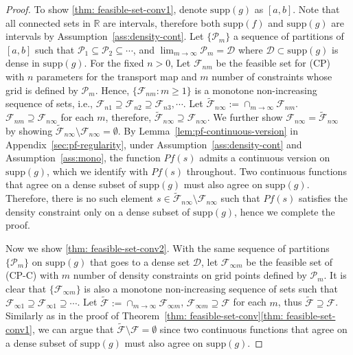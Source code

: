 \documentclass[12pt,leqno]{amsart}
\begin{document}
\begin{proof}
To show \ref{thm: feasible-set-conv1}, denote $\mathrm{supp}(g)$ as $[a, b]$. Note that all connected sets in $\mathbb R$ are intervals, therefore both $\mathrm{supp}(f)$ and $\mathrm{supp}(g)$ are intervals by Assumption~\ref{ass:density-cont}. Let $\{\mathcal{P}_m\}$ a sequence of partitions of $[a, b]$ such that $\mathcal{P}_1\subseteq\mathcal{P}_2\subseteq\cdots$, and $\lim_{m\rightarrow\infty}\mathcal{P}_m=\mathcal{D}$ where $\mathcal{D}\subset \mathrm{supp}(g)$ is dense in $\mathrm{supp}(g)$. For the fixed $n>0$, Let $\mathcal{F}_{nm}$ be the feasible set for (CP) with $n$ parameters for the transport map and $m$ number of constraints whose grid is defined by $\mathcal{P}_m$. Hence, $\{\mathcal{F}_{nm}: m \geq 1\}$ is a monotone non-increasing sequence of sets, i.e., $\mathcal{F}_{n1}\supseteq \mathcal{F}_{n2}\supseteq \mathcal{F}_{n3},\cdots$. Let $\tilde{\mathcal{F}}_{n\infty}:=\cap_{m\rightarrow\infty}\mathcal{F}_{nm}$. $\mathcal{F}_{nm} \supseteq \mathcal{F}_{n\infty}$ for each $m$, therefore, $ \tilde{\mathcal{F}}_{n\infty}\supseteq \mathcal{F}_{n\infty}$. We further show $\mathcal{F}_{n\infty}=\tilde{\mathcal{F}}_{n\infty}$ by showing $\tilde{\mathcal{F}}_{n\infty}\setminus\mathcal{F}_{n\infty}=\emptyset$.
By Lemma~\ref{lem:pf-continuous-version} in Appendix~\ref{sec:pf-regularity}, under Assumption~\ref{ass:density-cont} and Assumption~\ref{ass:mono}, the function $Pf(s)$ admits a continuous version on $\mathrm{supp}(g)$, which we identify with $Pf(s)$ throughout. Two continuous functions that agree on a dense subset of $\mathrm{supp}(g)$ must also agree on $\mathrm{supp}(g)$. Therefore, there is no such element $s\in\tilde{\mathcal{F}}_{n\infty}\setminus\mathcal{F}_{n\infty}$ such that $Pf(s)$ satisfies the density constraint only on a dense subset of $\mathrm{supp}(g)$, hence we complete the proof.

Now we show \ref{thm: feasible-set-conv2}. With the same sequence of partitions $\{\mathcal{P}_m\}$ on $\mathrm{supp}(g)$ that goes to a dense set $\mathcal{D}$, let $\mathcal{F}_{\infty m}$ be the feasible set of (CP-C) with $m$ number of density constraints on grid points defined by $\mathcal{P}_m$. It is clear that $\{\mathcal{F}_{\infty m}\}$ is also a monotone non-increasing sequence of sets such that $\mathcal{F}_{\infty 1}\supseteq \mathcal{F}_{\infty 1}\supseteq\cdots$. Let $\tilde{\mathcal{F}}:=  \cap_{m\rightarrow\infty}\mathcal{F}_{\infty m}$, $\mathcal{F}_{\infty  m} \supseteq \mathcal{F}$ for each $m$, thus $ \tilde{\mathcal{F}}\supseteq \mathcal{F}$. Similarly as in the proof of Theorem~\ref{thm: feasible-set-conv}\ref{thm: feasible-set-conv1}, we can argue that $\tilde{\mathcal{F}}\setminus\mathcal{F}=\emptyset$ since two continuous functions that agree on a dense subset of $\mathrm{supp}(g)$ must also agree on $\mathrm{supp}(g)$.
\end{proof}
\end{document}
